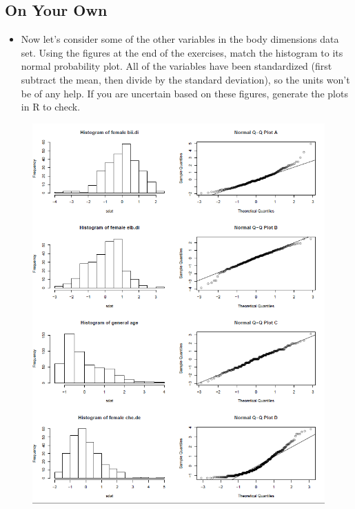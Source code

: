 \documentclass[]{article}
\providecommand{\tightlist}{%
  \setlength{\itemsep}{0pt}\setlength{\parskip}{0pt}}
\begin{document}
\subsection{On Your Own}\label{on-your-own}

\begin{itemize}
\tightlist
\item
  Now let's consider some of the other variables in the body dimensions
  data set. Using the figures at the end of the exercises, match the
  histogram to its normal probability plot. All of the variables have
  been standardized (first subtract the mean, then divide by the
  standard deviation), so the units won't be of any help. If you are
  uncertain based on these figures, generate the plots in R to check.
\end{itemize}

\begin{figure}[htbp]
\centering
\includegraphics{more/histQQmatch.png}
\caption{}
\end{figure}
\end{document}
